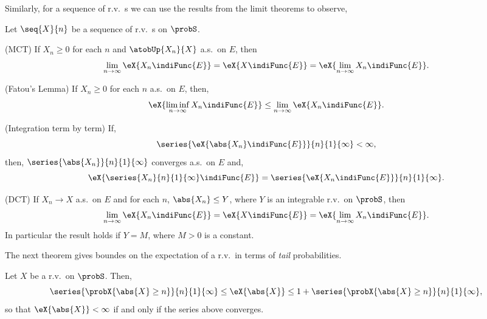 Similarly, for a sequence of r.v.~s we can use the results from the limit theorems to observe,
\begin{Observation}
    Let $\seq{X}{n}$ be a sequence of r.v.~s on $\probS$.
    \begin{properties}[resume*=expect]
    \item
	(MCT) If $X_n \ge 0$ for each $n$ and $\atobUp{X_n}{X}$ a.s.~on $E$, then
	\[\lim\limits_{n\to\infty}\eX{X_n\indiFunc{E}} = \eX{X\indiFunc{E}} =
	    \eX{\lim\limits_{n\to\infty}X_n\indiFunc{E}}.\]
    \item
	(Fatou's Lemma) If $X_n \ge 0$ for each $n$ a.s.~on $E$, then,
	\[\eX{\liminf\limits_{n\to\infty} X_n\indiFunc{E}} \leq \lim\limits_{n\to\infty}\eX{X_n\indiFunc{E}}.\]
    \item
	(Integration term by term) If,
	\[\series{\eX{\abs{X_n}\indiFunc{E}}}{n}{1}{\infty} < \infty,\]
	then,
	$\series{\abs{X_n}}{n}{1}{\infty}$ converges a.s.~on $E$ and,
	\[\eX{\series{X_n}{n}{1}{\infty}\indiFunc{E}} = \series{\eX{X_n\indiFunc{E}}}{n}{1}{\infty}.\]
    \item
	(DCT) If $X_n\to X$ a.s.~on $E$ and for each $n$, $\abs{X_n} \leq Y$, where $Y$ is an integrable
	r.v.~on $\probS$, then
	\[\lim\limits_{n\to\infty}\eX{X_n\indiFunc{E}} = \eX{X\indiFunc{E}} =
	    \eX{\lim\limits_{n\to\infty}X_n\indiFunc{E}}.\]
	In particular the result holds if $Y = M$, where $M > 0$ is a constant.
    \end{properties}
\end{Observation}
The next theorem gives boundes on the expectation of a r.v.~in terms of \emph{tail} probabilities.
\begin{Theorem}
    Let $X$ be a r.v.~on $\probS$. Then,
    \[\series{\probX{\abs{X}\geq n}}{n}{1}{\infty} \leq \eX{\abs{X}} \leq 
	1 + \series{\probX{\abs{X}\geq n}}{n}{1}{\infty}, \]
    so that $\eX{\abs{X}} < \infty$ if and only if the series above converges.
\end{Theorem}

